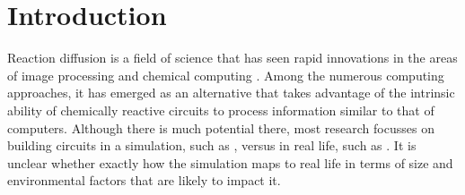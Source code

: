 \chapter{Introduction}
Reaction diffusion is a field of science that has seen rapid innovations in the areas of image processing \citep{kuhnert1989image} and chemical computing . Among the numerous computing approaches, it has emerged as an alternative that takes advantage of the intrinsic ability of chemically reactive circuits to process information similar to that of computers. 
Although there is much potential there, most research focusses on building circuits in a simulation, such as \cite{StovoldJames2019RaGI}, versus in real life, such as \cite{gorecki2003chemical}. It is unclear whether exactly how the simulation maps to real life in terms of size and environmental factors that are likely to impact it. 